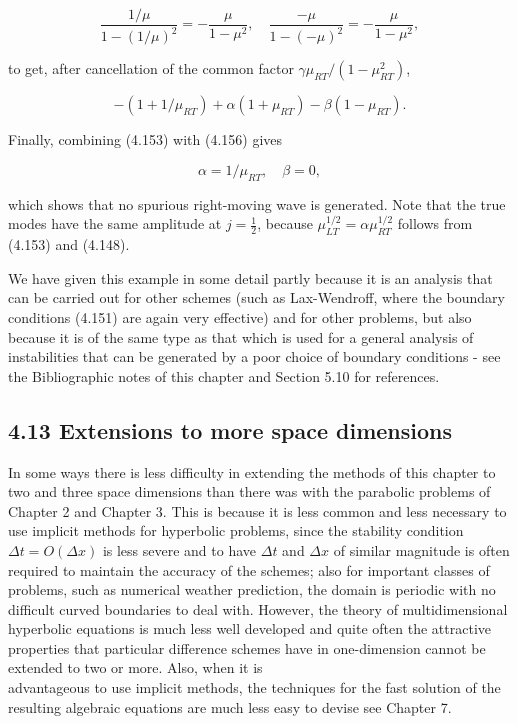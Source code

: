 \documentclass[10pt]{article}
\begin{document}
\[
\frac{1 / \mu}{1-(1 / \mu)^{2}}=-\frac{\mu}{1-\mu^{2}}, \quad \frac{-\mu}{1-(-\mu)^{2}}=-\frac{\mu}{1-\mu^{2}},
\]

to get, after cancellation of the common factor \(\gamma \mu_{R T} /\left(1-\mu_{R T}^{2}\right)\),

\[
-\left(1+1 / \mu_{R T}\right)+\alpha\left(1+\mu_{R T}\right)-\beta\left(1-\mu_{R T}\right) .
\]

Finally, combining (4.153) with (4.156) gives

\[
\alpha=1 / \mu_{R T}, \quad \beta=0,
\]

which shows that no spurious right-moving wave is generated. Note that the true modes have the same amplitude at \(j=\frac{1}{2}\), because \(\mu_{L T}^{1 / 2}=\alpha \mu_{R T}^{1 / 2}\) follows from (4.153) and (4.148).

We have given this example in some detail partly because it is an analysis that can be carried out for other schemes (such as Lax-Wendroff, where the boundary conditions (4.151) are again very effective) and for other problems, but also because it is of the same type as that which is used for a general analysis of instabilities that can be generated by a poor choice of boundary conditions - see the Bibliographic notes of this chapter and Section 5.10 for references.

\subsection*{4.13 Extensions to more space dimensions}
In some ways there is less difficulty in extending the methods of this chapter to two and three space dimensions than there was with the parabolic problems of Chapter 2 and Chapter 3. This is because it is less common and less necessary to use implicit methods for hyperbolic problems, since the stability condition \(\Delta t=O(\Delta x)\) is less severe and to have \(\Delta t\) and \(\Delta x\) of similar magnitude is often required to maintain the accuracy of the schemes; also for important classes of problems, such as numerical weather prediction, the domain is periodic with no difficult curved boundaries to deal with. However, the theory of multidimensional hyperbolic equations is much less well developed and quite often the attractive properties that particular difference schemes have in one-dimension cannot be extended to two or more. Also, when it is\\
advantageous to use implicit methods, the techniques for the fast solution of the resulting algebraic equations are much less easy to devise see Chapter 7.
\end{document}
